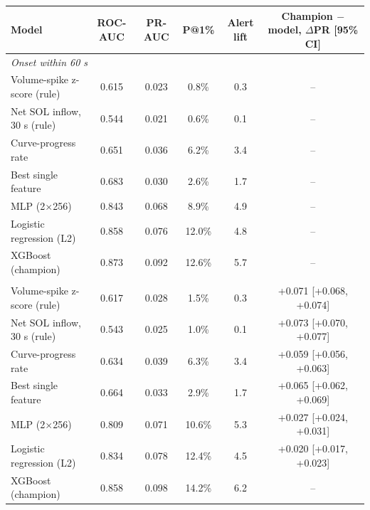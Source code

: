 \begin{tabular}{lccccc}
\toprule
Model & ROC-AUC & PR-AUC & P@1\% & Alert lift & Champion $-$ model, $\Delta$PR [95\% CI] \\
\midrule
\multicolumn{6}{l}{\emph{Onset within 60 s}} \\
Volume-spike z-score (rule) & 0.615 & 0.023 & 0.8\% & 0.3 & -- \\
Net SOL inflow, 30 s (rule) & 0.544 & 0.021 & 0.6\% & 0.1 & -- \\
Curve-progress rate & 0.651 & 0.036 & 6.2\% & 3.4 & -- \\
Best single feature & 0.683 & 0.030 & 2.6\% & 1.7 & -- \\
MLP (2$\times$256) & 0.843 & 0.068 & 8.9\% & 4.9 & -- \\
Logistic regression (L2) & 0.858 & 0.076 & 12.0\% & 4.8 & -- \\
XGBoost (champion) & 0.873 & 0.092 & 12.6\% & 5.7 & -- \\
\addlinespace
\multicolumn{6}{l}{\emph{Onset within 300 s}} \\
Volume-spike z-score (rule) & 0.617 & 0.028 & 1.5\% & 0.3 & +0.071 [+0.068, +0.074] \\
Net SOL inflow, 30 s (rule) & 0.543 & 0.025 & 1.0\% & 0.1 & +0.073 [+0.070, +0.077] \\
Curve-progress rate & 0.634 & 0.039 & 6.3\% & 3.4 & +0.059 [+0.056, +0.063] \\
Best single feature & 0.664 & 0.033 & 2.9\% & 1.7 & +0.065 [+0.062, +0.069] \\
MLP (2$\times$256) & 0.809 & 0.071 & 10.6\% & 5.3 & +0.027 [+0.024, +0.031] \\
Logistic regression (L2) & 0.834 & 0.078 & 12.4\% & 4.5 & +0.020 [+0.017, +0.023] \\
XGBoost (champion) & 0.858 & 0.098 & 14.2\% & 6.2 & -- \\
\bottomrule
\end{tabular}
